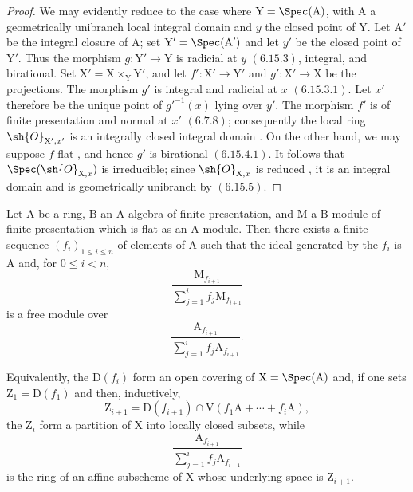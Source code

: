 \begin{proof}
We may evidently reduce to the case where $\mathrm{Y}=\Spec(\mathrm{A})$, with $\mathrm{A}$ a geometrically unibranch local integral domain and $y$ the closed point of $\mathrm{Y}$. Let $\mathrm{A}'$ be the integral closure of $\mathrm{A}$; set $\mathrm{Y}'=\Spec(\mathrm{A}')$ and let $y'$ be the closed point of $\mathrm{Y}'$. Thus the morphism $g:\mathrm{Y}'\to\mathrm{Y}$ is radicial at $y$ $(6.15.3)$, integral, and birational. Set $\mathrm{X}'=\mathrm{X}\times_\mathrm{Y}\mathrm{Y}'$, and let $f':\mathrm{X}'\to\mathrm{Y}'$ and $g':\mathrm{X}'\to\mathrm{X}$ be the projections. The morphism $g'$ is integral and radicial at $x$ $(6.15.3.1)$. Let $x'$ therefore be the unique point of $g'^{-1}(x)$ lying over $y'$. The morphism $f'$ is of finite presentation and normal at $x'$ $(6.7.8)$; consequently the local ring $\sh{O}_{\mathrm{X}',x'}$ is an integrally closed integral domain . On the other hand, we may suppose $f$ flat , and hence $g'$ is birational $(6.15.4.1)$. It follows that $\Spec(\sh{O}_{\mathrm{X},x})$ is irreducible; since $\sh{O}_{\mathrm{X},x}$ is reduced , it is an integral domain and is geometrically unibranch by $(6.15.5)$.
\end{proof}

\begin{proposition}[11.3.15]
\label{IV.11.3.15}
Let $\mathrm{A}$ be a ring, $\mathrm{B}$ an $\mathrm{A}$-algebra of finite presentation, and $\mathrm{M}$ a $\mathrm{B}$-module of finite presentation which is flat as an $\mathrm{A}$-module. Then there exists a finite sequence $(f_i)_{1\leqslant i\leqslant n}$ of elements of $\mathrm{A}$ such that the ideal generated by the $f_i$ is $\mathrm{A}$ and, for $0\leqslant i<n$,
\[
  \frac{\mathrm{M}_{f_{i+1}}}
       {\sum_{j=1}^{i}f_j\mathrm{M}_{f_{i+1}}}
\]
is a free module over
\[
  \frac{\mathrm{A}_{f_{i+1}}}
       {\sum_{j=1}^{i}f_j\mathrm{A}_{f_{i+1}}}.
\]
\end{proposition}

Equivalently, the $\mathrm{D}(f_i)$ form an open covering of $\mathrm{X}=\Spec(\mathrm{A})$ and, if one sets $\mathrm{Z}_1=\mathrm{D}(f_1)$ and then, inductively,
\[
  \mathrm{Z}_{i+1}
  =\mathrm{D}(f_{i+1})
   \cap\mathrm{V}(f_1\mathrm{A}+\cdots+f_i\mathrm{A}),
\]
the $\mathrm{Z}_i$ form a partition of $\mathrm{X}$ into locally closed subsets, while
\[
  \frac{\mathrm{A}_{f_{i+1}}}
       {\sum_{j=1}^{i}f_j\mathrm{A}_{f_{i+1}}}
\]
is the ring of an affine subscheme of $\mathrm{X}$ whose underlying space is $\mathrm{Z}_{i+1}$.

